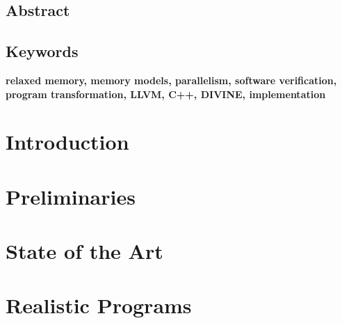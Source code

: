 \documentclass[11pt,twoside,a4paper]{book}
\newcommand{\FI}{Faculty of Informatics}
\newcommand{\MU}{Masaryk University}
\newcommand{\Jirik}{prof. RNDr. Jiří Barnat, Ph.D.}
\newcommand{\thesistitle}{Analysis of Parallel C++ Programs} %
\newcommand{\thesissubtitle}{PHD Thesis}
\newcommand{\thesisauthor}{Vladimír Štill}
\newcommand{\thesisYearCity}{Brno, 2020}
\newcommand{\thesisadvisor}{\Jirik}
\theoremstyle{mydefstyle}
\newcommand{\TODO}[1]{{\bf\color{red}#1}}
\begin{document}

\frontmatter
 
 
\cleardoublepage

\section*{Abstract}
% 

\section*{Keywords}
\TODO{relaxed memory, memory models, parallelism, software verification, program transformation,
LLVM, C++, DIVINE, implementation}

\cleardoublepage
\thispagestyle{empty}

\pagestyle{headings}
\tableofcontents %
\mainmatter

\chapter{Introduction}\label{chap:introduction}


\chapter{Preliminaries}


\chapter{State of the Art}


\chapter{Realistic Programs} \label{chap:lang}

\end{document}
